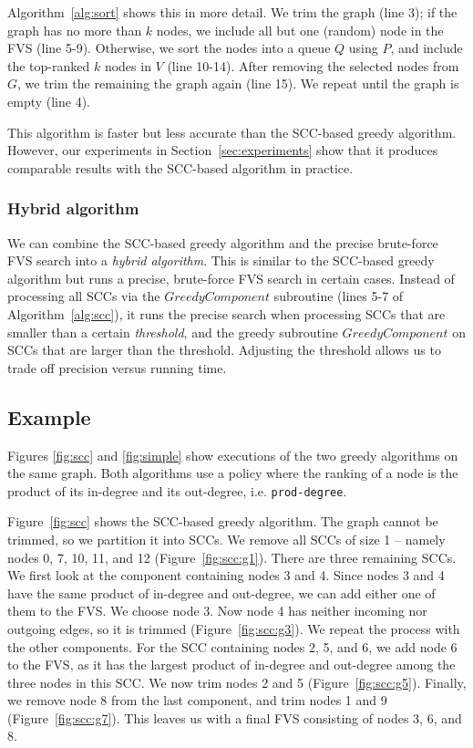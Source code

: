 Algorithm~\ref{alg:sort} shows this in more detail. We trim the graph (line 3); if the graph has no more than $k$ nodes, we include all but one (random) node in the FVS  (line 5-9). Otherwise, we sort the nodes into a queue $Q$ using $P$, and include the top-ranked $k$ nodes in $V$ (line 10-14).
After removing the selected nodes from $G$, we trim the remaining the graph again (line 15). We repeat until the graph is empty (line 4).

This algorithm is faster but less accurate than the SCC-based greedy algorithm. However,  our experiments in Section~\ref{sec:experiments} show that it produces comparable results with the SCC-based algorithm in practice.

\subsubsection{Hybrid algorithm} We can combine the SCC-based greedy algorithm and the precise brute-force FVS search into a \emph{hybrid algorithm}. This is similar to the SCC-based greedy algorithm but runs a precise, brute-force FVS search in certain cases. Instead of processing all SCCs via the $GreedyComponent$ subroutine (lines 5-7 of Algorithm~\ref{alg:scc}), it runs the precise search when processing SCCs that are smaller than a certain \emph{threshold}, and the greedy subroutine $GreedyComponent$ on SCCs that are larger than the threshold. Adjusting the threshold allows us to trade off precision versus running time.


\subsection{Example}\label{subsec:alg_example}

Figures \ref{fig:scc} and \ref{fig:simple} show executions of the two greedy algorithms on the same graph. Both algorithms use a policy where the ranking of a node is the product of its in-degree and its out-degree, i.e. \texttt{prod-degree}.

Figure~\ref{fig:scc} shows the SCC-based greedy algorithm. The graph cannot be trimmed, so we partition it into SCCs. We remove all SCCs of size 1 -- namely nodes 0, 7, 10, 11, and 12 (Figure~\ref{fig:scc:g1}). There are three remaining SCCs. We first look at the component containing nodes 3 and 4. Since nodes 3 and 4 have the same product of in-degree and out-degree, we can add either one of them to the FVS. We choose node 3. Now node 4 has neither incoming nor outgoing edges, so it is trimmed (Figure~\ref{fig:scc:g3}). We repeat the process with the other components. For the SCC containing nodes 2, 5, and 6, we add node 6 to the FVS, as it has the largest product of in-degree and out-degree among the three nodes in this SCC. We now trim nodes 2 and 5 (Figure~\ref{fig:scc:g5}). Finally, we remove node 8 from the last component, and trim nodes 1 and 9 (Figure~\ref{fig:scc:g7}). This leaves us with a final FVS consisting of nodes 3, 6, and 8.

